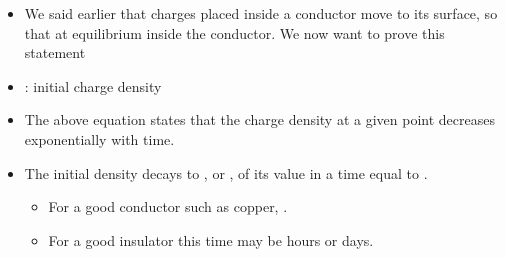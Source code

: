 \begin{ELunit}

\begin{itemize}
\tightlist
\item
  We said earlier that charges placed inside a conductor move to its surface, so that at equilibrium  inside the conductor. We now want to prove this statement
\end{itemize}


\begin{itemize}
\tightlist
\item
  : initial charge density
\item
  The above equation states that the charge density at a given point decreases exponentially with time.
\item
  The initial density decays to , or , of its value in a time equal to \ELim{\tau=\epsilon/\sigma}.

  \begin{itemize}
  \tightlist
  \item
    For a good conductor such as copper, .
  \item
    For a good insulator this time may be hours or days.
  \end{itemize}
\end{itemize}

\end{ELunit}

\ELhold


